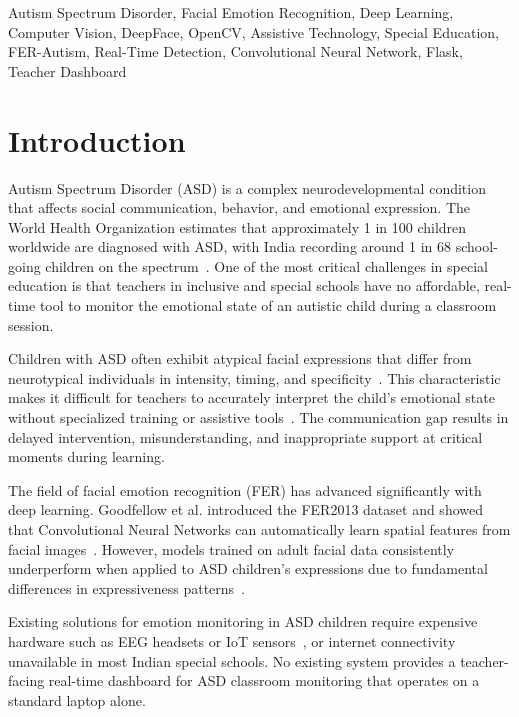 \documentclass[conference]{IEEEtran}
\begin{document}
\begin{IEEEkeywords}
Autism Spectrum Disorder, Facial Emotion Recognition, Deep
Learning, Computer Vision, DeepFace, OpenCV, Assistive
Technology, Special Education, FER-Autism, Real-Time Detection,
Convolutional Neural Network, Flask, Teacher Dashboard
\end{IEEEkeywords}

\section{Introduction}

Autism Spectrum Disorder (ASD) is a complex neurodevelopmental
condition that affects social communication, behavior, and
emotional expression. The World Health Organization estimates
that approximately 1 in 100 children worldwide are diagnosed
with ASD, with India recording around 1 in 68 school-going
children on the spectrum~\cite{who2023}. One of the most
critical challenges in special education is that teachers in
inclusive and special schools have no affordable, real-time
tool to monitor the emotional state of an autistic child during
a classroom session.

Children with ASD often exhibit atypical facial expressions
that differ from neurotypical individuals in intensity, timing,
and specificity~\cite{trevisan2018}. This characteristic makes
it difficult for teachers to accurately interpret the child's
emotional state without specialized training or assistive
tools~\cite{leo2015}. The communication gap results in delayed
intervention, misunderstanding, and inappropriate support at
critical moments during learning.

The field of facial emotion recognition (FER) has advanced
significantly with deep learning. Goodfellow et al.
introduced the FER2013 dataset and showed that Convolutional
Neural Networks can automatically learn spatial features from
facial images~\cite{goodfellow2013}. However, models trained
on adult facial data consistently underperform when applied
to ASD children's expressions due to fundamental differences
in expressiveness patterns~\cite{radocaj2025,leo2015}.

Existing solutions for emotion monitoring in ASD children
require expensive hardware such as EEG headsets or IoT
sensors~\cite{talaat2023}, or internet connectivity
unavailable in most Indian special schools. No existing system
provides a teacher-facing real-time dashboard for ASD
classroom monitoring that operates on a standard laptop alone.
\end{document}
